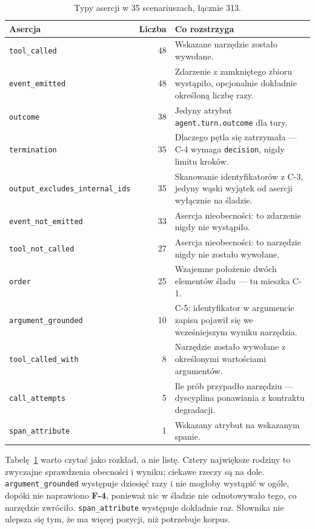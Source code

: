 \documentclass[11pt,a4paper]{article}
\newcommand{\finding}[1]{{\color{primaryblue}\textbf{#1}}}
\begin{document}
\begin{table}[htbp]
\centering
\caption{Typy asercji w 35 scenariuszach, łącznie 313.}
\label{tab:assertions}
\begin{tabularx}{\linewidth}{l r X}
\toprule
\textbf{Asercja} & \textbf{Liczba} & \textbf{Co rozstrzyga} \\
\midrule
\texttt{tool\_called} & 48 & Wskazane narzędzie zostało wywołane. \\
\texttt{event\_emitted} & 48 & Zdarzenie z zamkniętego zbioru wystąpiło, opcjonalnie dokładnie określoną liczbę razy. \\
\texttt{outcome} & 38 & Jedyny atrybut \texttt{agent.turn.outcome} dla tury. \\
\texttt{termination} & 35 & Dlaczego pętla się zatrzymała --- C-4 wymaga \texttt{decision}, nigdy limitu kroków. \\
\texttt{output\_excludes\_internal\_ids} & 35 & Skanowanie identyfikatorów z C-3, jedyny wąski wyjątek od asercji wyłącznie na śladzie. \\
\texttt{event\_not\_emitted} & 33 & Asercja nieobecności: to zdarzenie nigdy nie wystąpiło. \\
\texttt{tool\_not\_called} & 27 & Asercja nieobecności: to narzędzie nigdy nie zostało wywołane. \\
\texttt{order} & 25 & Wzajemne położenie dwóch elementów śladu --- tu mieszka C-1. \\
\texttt{argument\_grounded} & 10 & C-5: identyfikator w argumencie zapisu pojawił się we wcześniejszym wyniku narzędzia. \\
\texttt{tool\_called\_with} & 8 & Narzędzie zostało wywołane z określonymi wartościami argumentów. \\
\texttt{call\_attempts} & 5 & Ile prób przypadło narzędziu --- dyscyplina ponawiania z kontraktu degradacji. \\
\texttt{span\_attribute} & 1 & Wskazany atrybut na wskazanym spanie. \\
\bottomrule
\end{tabularx}
\end{table}

Tabelę~\ref{tab:assertions} warto czytać jako rozkład, a nie listę. Cztery największe rodziny to zwyczajne sprawdzenia obecności i wyniku; ciekawe rzeczy są na dole. \texttt{argument\_grounded} występuje dziesięć razy i nie mogłoby wystąpić w ogóle, dopóki nie naprawiono \finding{F-4}, ponieważ nic w śladzie nie odnotowywało tego, co narzędzie zwróciło. \texttt{span\_attribute} występuje dokładnie raz. Słownika nie ulepsza się tym, że ma więcej pozycji, niż potrzebuje korpus.
\end{document}
